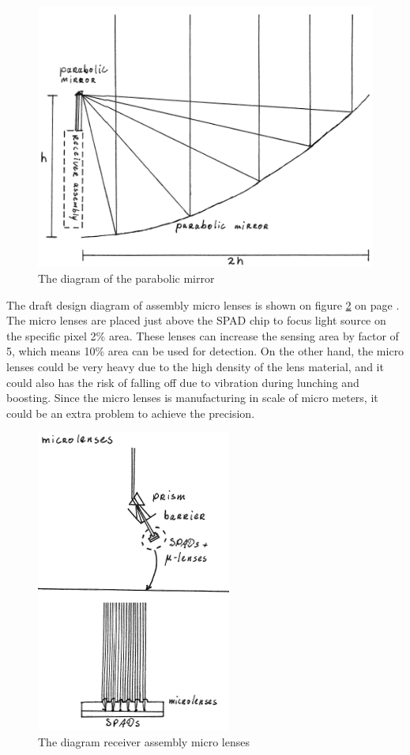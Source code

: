 \begin{figure}[ht!]
\centering
\includegraphics[scale = 0.6]{chapters/img/DiagramReceiverGeneral.png}
\caption{The diagram of the parabolic mirror}
\label{fig:diagram_Rgeneral}
\end{figure}

The draft design diagram of assembly micro lenses is shown on figure \ref{fig:diagram_Rmicrolenses} on page \pageref{fig:diagram_Rmicrolenses}. The micro lenses are placed just above the \acs{SPAD} chip to focus light source on the specific pixel 2\% area. These lenses can increase the sensing area by factor of 5, which means 10\% area can be used for detection. On the other hand, the micro lenses could be very heavy due to the high density of the lens material, and it could also has the risk of falling off due to vibration during lunching and boosting. Since the micro lenses is manufacturing in scale of micro meters, it could be an extra problem to achieve the precision.

\begin{figure}[ht!]
\centering
\includegraphics[scale = 0.6]{chapters/img/DiagramReceiverAssemblyMicrolenses.png}
\caption{The diagram receiver assembly micro lenses}
\label{fig:diagram_Rmicrolenses}
\end{figure}

